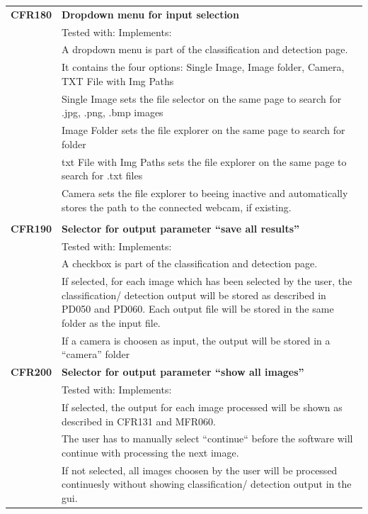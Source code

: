 \documentclass[parskip=full]{scrartcl}
\begin{document}
\newpage
\begin{tabular}{p{2cm}p{11.4cm}}
\textbf{CFR180} \hypertarget{CFR180} & \textbf{Dropdown menu for input selection}\\
& Tested with: Implements:  \\
& A dropdown menu is part of the classification and detection page.\\
& It contains the four options: Single Image, Image folder, Camera, TXT File with Img Paths\\
& Single Image sets the file selector on the same page to search for .jpg, .png, .bmp images\\
& Image Folder sets the file explorer on the same page to search for folder\\
& txt File with Img Paths sets the file explorer on the same page to search for .txt files\\
& Camera sets the file explorer to beeing inactive and automatically stores the path to the connected webcam, if existing.\\
& \\
\textbf{CFR190} \hypertarget{CFR190} & \textbf{Selector for output parameter ``save all results''}\\
& Tested with: Implements:  \\
& A checkbox is part of the classification and detection page.\\
& If selected, for each image which has been selected by the user, the classification/ detection output will be stored as described in PD050 and PD060. Each output file will be stored in the same folder as the input file.\\
& If a camera is choosen as input, the output will be stored in a ``camera'' folder\\
\textbf{CFR200} \hypertarget{CFR200} & \textbf{Selector for output parameter ``show all images''}\\
& Tested with: Implements:  \\
& If selected, the output for each image processed will be shown as described in CFR131 and MFR060.\\
& The user has to manually select ``continue`` before the software will continue with processing the next image.\\
& If not selected, all images choosen by the user will be processed continuesly without showing classification/ detection output in the gui.\\
\end{tabular}
\end{document}
